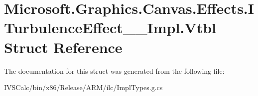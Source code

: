 \hypertarget{struct_microsoft_1_1_graphics_1_1_canvas_1_1_effects_1_1_i_turbulence_effect_____impl_1_1_vtbl}{}\section{Microsoft.\+Graphics.\+Canvas.\+Effects.\+I\+Turbulence\+Effect\+\_\+\+\_\+\+Impl.\+Vtbl Struct Reference}
\label{struct_microsoft_1_1_graphics_1_1_canvas_1_1_effects_1_1_i_turbulence_effect_____impl_1_1_vtbl}


The documentation for this struct was generated from the following file\+:\begin{DoxyCompactItemize}
\item 
I\+V\+S\+Calc/bin/x86/\+Release/\+A\+R\+M/ilc/Impl\+Types.\+g.\+cs\end{DoxyCompactItemize}
